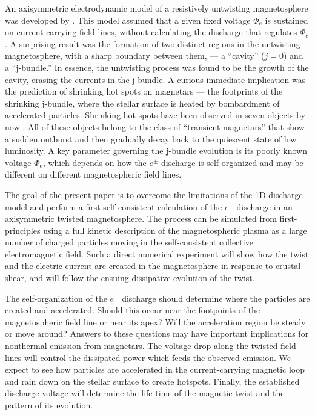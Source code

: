 An axisymmetric electrodynamic model of a resistively untwisting magnetosphere
was developed by
\citet[hereafter B09]{2009ApJ...703.1044B}.
This model assumed
that a given fixed voltage $\Phi_e$ is sustained on current-carrying field lines,
without calculating the discharge that regulates $\Phi_e$.
A surprising result was
the formation of two distinct regions in the untwisting magnetosphere, with a
sharp boundary between them, --- a ``cavity'' ($j=0$) and a ``j-bundle.'' In
essence, the untwisting process was found to be the growth of the cavity,
erasing the currents in the j-bundle. A curious immediate implication was the
prediction of shrinking hot spots on magnetars --- the footprints of the
shrinking j-bundle, where the stellar surface is heated by bombardment of
  accelerated particles. Shrinking hot spots have been observed in seven
objects by now
\citetext{see data compilation in \citealp{2016arXiv160509077B}}.
All of these objects
belong to the class of ``transient magnetars'' that show a sudden outburst and then
gradually decay back to the quiescent state of low luminosity.
A key parameter governing the j-bundle evolution is its poorly known voltage $\Phi_e$,
which depends on how the $e^\pm$ discharge is self-organized and
may be different on different magnetospheric field lines.

The goal of the present paper is to overcome the limitations of the 1D discharge
model and perform a first self-consistent calculation of the $e^\pm$ discharge
in an axisymmetric twisted magnetosphere. The process can be simulated from
first-principles using a full kinetic description of the magnetospheric plasma
as a large number of charged particles moving in the self-consistent collective
electromagnetic field. Such a direct numerical experiment will show how the
twist and the electric current are created in the magnetosphere in response to
crustal shear, and will follow the ensuing dissipative evolution of the twist.

The self-organization of the $e^\pm$ discharge should determine where the
particles are created and accelerated. Should this occur near the footpoints of
the magnetospheric field line or near its apex? Will the acceleration region be
steady or move around? Answers to these questions may have important
implications for nonthermal emission from magnetars. The voltage drop along the
twisted field lines will control the dissipated power which feeds the observed
emission. We expect to see how particles are accelerated in the current-carrying
magnetic loop and rain down on the stellar surface to create hotspots. Finally,
the established discharge voltage will determine the life-time of the magnetic
twist and the pattern of its evolution.

